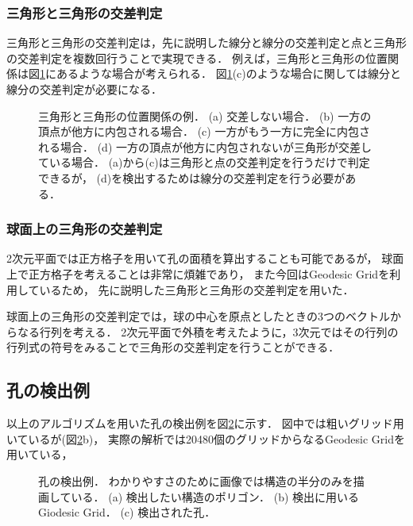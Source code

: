 \subsubsection{三角形と三角形の交差判定}
三角形と三角形の交差判定は，先に説明した線分と線分の交差判定と点と三角形の交差判定を複数回行うことで実現できる．
例えば，三角形と三角形の位置関係は図\ref{fig:triangle_triangle}にあるような場合が考えられる．
図\ref{fig:triangle_triangle}(c)のような場合に関しては線分と線分の交差判定が必要になる．
\begin{figure}
    \centering
    
    \caption{
        三角形と三角形の位置関係の例．
        (a) 交差しない場合．
        (b) 一方の頂点が他方に内包される場合．
        (c) 一方がもう一方に完全に内包される場合．
        (d) 一方の頂点が他方に内包されないが三角形が交差している場合．
            (a)から(c)は三角形と点の交差判定を行うだけで判定できるが，
            (d)を検出するためは線分の交差判定を行う必要がある．
    }
    \label{fig:triangle_triangle}
\end{figure}


\subsubsection{球面上の三角形の交差判定}
2次元平面では正方格子を用いて孔の面積を算出することも可能であるが，
球面上で正方格子を考えることは非常に煩雑であり，
また今回はGeodesic Gridを利用しているため，
先に説明した三角形と三角形の交差判定を用いた．

球面上の三角形の交差判定では，球の中心を原点としたときの3つのベクトルからなる行列を考える．
2次元平面で外積を考えたように，3次元ではその行列の行列式の符号をみることで三角形の交差判定を行うことができる．


\subsection{孔の検出例}
以上のアルゴリズムを用いた孔の検出例を図\ref{fig:hole_detection}に示す．
図中では粗いグリッド用いているが(図\ref{fig:hole_detection}b)，
実際の解析では20480個のグリッドからなるGeodesic Gridを用いている，
\begin{figure}
    \centering
    
    \caption{
        孔の検出例．
        わかりやすさのために画像では構造の半分のみを描画している．
        (a) 検出したい構造のポリゴン．
        (b) 検出に用いるGiodesic Grid．
        (c) 検出された孔．
    }
    \label{fig:hole_detection}
\end{figure}
